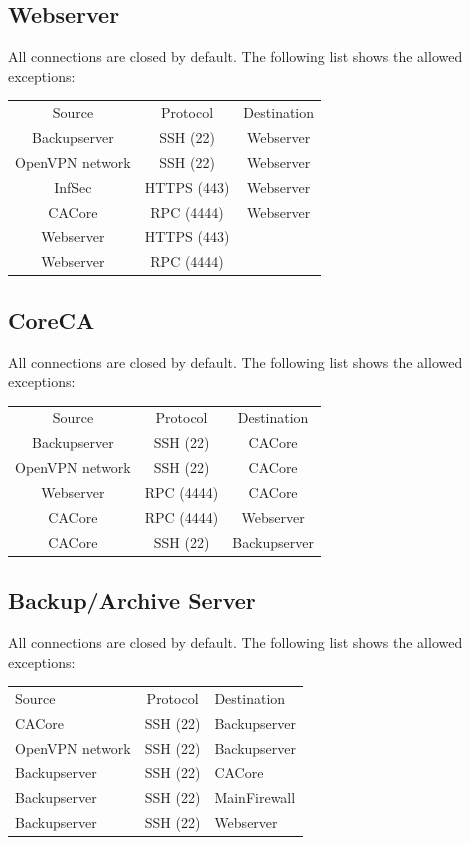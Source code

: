 \documentclass[a4paper,11pt]{article}
\begin{document}
\subsection{Webserver}
All connections are closed by default. The following list shows the allowed exceptions:\newline


\begin{tabular}{c c c}
Source & Protocol & Destination \\
\cline{1-3}
Backupserver & SSH (22) & Webserver \\
\cline{1-3}
OpenVPN network & SSH (22) & Webserver \\
\cline{1-3}
InfSec & HTTPS (443) & Webserver \\
\cline{1-3}
CACore & RPC (4444) & Webserver \\
\cline{1-3}
Webserver & HTTPS (443) &  \\
\cline{1-3}
Webserver & RPC (4444) &  \\
\end{tabular}

\subsection{CoreCA}
All connections are closed by default. The following list shows the allowed exceptions:\newline


\begin{tabular}{c c c}
Source & Protocol & Destination \\
\cline{1-3}
Backupserver & SSH (22) & CACore \\
\cline{1-3}
OpenVPN network & SSH (22) & CACore \\
\cline{1-3}
Webserver & RPC (4444) & CACore \\
\cline{1-3}
CACore & RPC (4444) & Webserver \\
\cline{1-3}
CACore & SSH (22) & Backupserver \\
\end{tabular}

\subsection{Backup/Archive Server}
All connections are closed by default. The following list shows the allowed exceptions:\newline


\begin{tabular}{l c l}
Source & Protocol & Destination \\
\cline{1-3}
CACore & SSH (22) & Backupserver \\
\cline{1-3}
OpenVPN network & SSH (22) &  Backupserver\\
\cline{1-3}
Backupserver & SSH (22) & CACore \\
\cline{1-3}
Backupserver & SSH (22) & MainFirewall \\
\cline{1-3}
Backupserver & SSH (22) & Webserver \\
\end{tabular}
\end{document}
